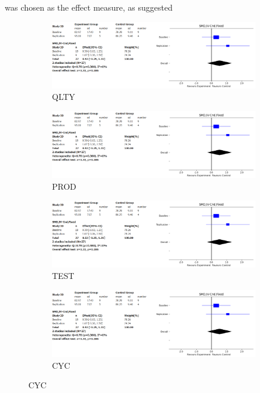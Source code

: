 was chosen as the effect measure, as suggested 

\begin{figure}[htbp]
    \centering
    \begin{subfigure}{0.5\textwidth}
        \includegraphics[width=\linewidth]{figures/forest_plots/QLTY.png}
        \caption{QLTY}
        \label{fp1}
    \end{subfigure}\hfil
    \begin{subfigure}{0.5\textwidth}
        \includegraphics[width=\linewidth]{figures/forest_plots/QLTY.png}
        \caption{PROD}
        \label{fp2}
    \end{subfigure}

    \medskip

    \begin{subfigure}{0.5\textwidth}
        \includegraphics[width=\linewidth]{figures/forest_plots/QLTY.png}
        \caption{TEST}
        \label{fp3}
    \end{subfigure}\hfil
    \begin{subfigure}{0.5\textwidth}
        \includegraphics[width=\linewidth]{figures/forest_plots/QLTY.png}
        \caption{CYC}
        \label{fp4}
    \end{subfigure}


\end{figure}
